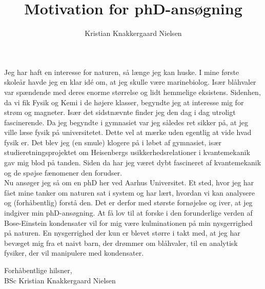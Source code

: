 \documentclass[10pt]{article}
\title{Motivation for phD-ansøgning}
\author{Kristian Knakkergaard Nielsen}
\begin{document}
\maketitle
Jeg har haft en interesse for naturen, så længe jeg kan huske. I mine første skoleår havde jeg en klar idé om, at jeg skulle være marinebiolog. Især blåhvaler var spændende med deres enorme størrelse og lidt hemmelige eksistens. Sidenhen, da vi fik Fysik og Kemi i de højere klasser, begyndte jeg at interesse mig for strøm og magneter. Især det sidstnævnte finder jeg den dag i dag utroligt fascinerende. Da jeg begyndte i gymnasiet var jeg således ret sikker på, at jeg ville læse fysik på universitetet. Dette vel at mærke uden egentlig at vide hvad fysik er. Det blev jeg (en smule) klogere på i løbet af gymnasiet, især studieretningsprojektet om Heisenbergs usikkerhedsrelationer i kvantemekanik gav mig blod på tanden. Siden da har jeg været dybt fascineret af kvantemekanik og de spøjse fænomener den forudser. 
\\

Nu ansøger jeg så om en phD her ved Aarhus Universitet. Et sted, hvor jeg har fået mine tanker om naturen sat i system og har lært, hvordan vi kan analysere og (forhåbentlig) forstå den. Det er derfor med største fornøjelse og iver, at jeg indgiver min phD-ansøgning. At få lov til at forske i den forunderlige verden af Bose-Einstein kondensater vil for mig være kulminationen på min nysgerrighed på naturen. En nysgerrighed der kun er blevet større i takt med, at jeg har bevæget mig fra et naivt barn, der drømmer om blåhvaler, til en analytisk fysiker, der vil manipulere med kondensater. 
\vspace{1cm}

Forhåbentlige hilsner,
\\

BSc Kristian Knakkergaard Nielsen
\end{document}
